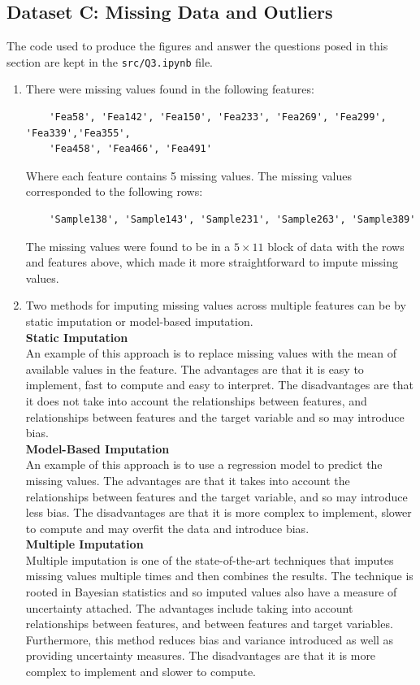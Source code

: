 \documentclass{article}
\begin{document}
\subsection{Dataset C: Missing Data and Outliers}
The code used to produce the figures and answer the questions posed in this section are kept in the \verb|src/Q3.ipynb| file.
\label{subsec:Q3}
\begin{enumerate}[label=\alph*)]
    \item There were missing values found in the following features:
    \begin{verbatim}
    'Fea58', 'Fea142', 'Fea150', 'Fea233', 'Fea269', 'Fea299', 'Fea339','Fea355', 
    'Fea458', 'Fea466', 'Fea491'
    \end{verbatim}
    Where each feature contains 5 missing values. The missing values corresponded to the following rows:
    \begin{verbatim}
    'Sample138', 'Sample143', 'Sample231', 'Sample263', 'Sample389'
    \end{verbatim}
    The missing values were found to be in a $5\times11$ block of data with the rows and features above, which made it more straightforward to impute missing values.

    \item Two methods for imputing missing values across multiple features can be by static imputation or model-based imputation.\\
    
    \textbf{Static Imputation}\\
    An example of this approach is to replace missing values with the mean of available values in the feature. The advantages are that it is easy to implement, fast to compute and easy to interpret. The disadvantages are that it does not take into account the relationships between features, and relationships between features and the target variable and so may introduce bias.\\

    \textbf{Model-Based Imputation}\\
    An example of this approach is to use a regression model to predict the missing values. The advantages are that it takes into account the relationships between features and the target variable, and so may introduce less bias. The disadvantages are that it is more complex to implement, slower to compute and may overfit the data and introduce bias.\\

    \textbf{Multiple Imputation}\\
    Multiple imputation is one of the state-of-the-art techniques that imputes missing values multiple times and then combines the results. The technique is rooted in Bayesian statistics and so imputed values also have a measure of uncertainty attached. The advantages include taking into account relationships between features, and between features and target variables. Furthermore, this method reduces bias and variance introduced as well as providing uncertainty measures. The disadvantages are that it is more complex to implement and slower to compute.


\end{enumerate}
\end{document}

